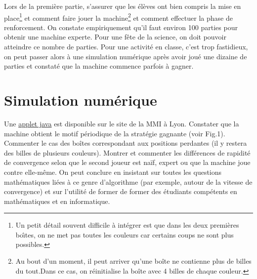 \documentclass[a4paper,12pt]{article}
\begin{document}
Lors de la première partie, s'assurer que les élèves ont bien compris la mise en place\footnote{Un petit détail souvent difficile à intégrer est que dans les deux premières bo\^\i tes, on ne met pas toutes les couleurs car certains coups ne sont plus possibles.} et comment faire jouer la machine\footnote{Au bout d'un moment, il peut arriver qu'une boîte ne contienne plus de billes du tout.Dans ce cas, on réinitialise la boîte avec 4 billes de chaque couleur.} et comment effectuer la phase de renforcement.
%
On constate empiriquement qu'il faut environ 100 parties pour obtenir une machine experte. Pour une fête de la science, on doit pouvoir atteindre ce nombre de parties. Pour une activité en classe, c'est trop fastidieux, on peut passer alors à une simulation numérique après avoir joué une dizaine de parties et constaté que la machine commence parfois à gagner.

\section{Simulation numérique} \label{simulation-numuxe9rique}
\noindent Une \href{https://u.pcloud.link/publink/show?code=XZsn7zVZrWj4xUeBzmhLp8Pxd7ismY5ezrMX}{applet
java} est disponible sur le site de la MMI\cite{MMI} à Lyon. Constater que la machine obtient le motif périodique de la stratégie gagnante (voir Fig.1). Commenter le cas des boîtes correspondant aux positions perdantes (il y restera des billes de plusieurs couleurs). Montrer et commenter les différences de rapidité de convergence selon que le second joueur est naïf, expert ou que la machine joue contre elle-même.
%
On peut conclure en insistant sur toutes les questions mathématiques liées à ce genre d'algorithme (par exemple, autour de la vitesse de convergence) et sur l'utilité de former de former des étudiants compétents en mathématiques et en informatique.
\end{document}
